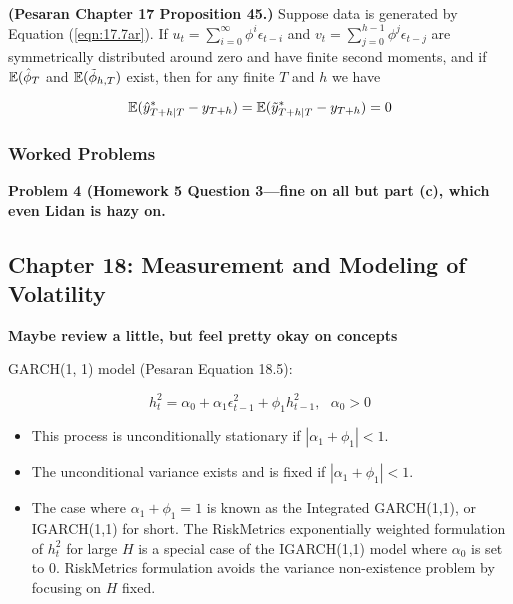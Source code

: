 \begin{proposition}\textbf{(Pesaran Chapter 17 Proposition 45.)} Suppose data is generated by Equation (\ref{eqn:17.7ar}). If \(u_t = \sum_{i=0}^\infty \phi^i \epsilon_{t-i}\) and \(v_t = \sum_{j=0}^{h-1} \phi^j \epsilon_{t-j}\) are symmetrically distributed around zero and have finite second moments, and if \(\mathbb{E}(\hat{\phi}_T\) and \(\mathbb{E}(\tilde{\phi}_{h,T} )\) exist, then for any finite \(T\) and \(h\) we have

\[
\mathbb{E}(\hat{y}_{T+h \mid T}^* - y_{T +h}) = \mathbb{E} (\tilde{y}_{T+h \mid T}^* - y_{T+h}) = 0
\]
\end{proposition}

\subsubsection{Worked Problems}

\textbf{Problem 4 (Homework 5 Question 3---fine on all but part (c), which even Lidan is hazy on.}

%
%
%
%
%
%

\subsection{Chapter 18: Measurement and Modeling of Volatility}

\textbf{Maybe review a little, but feel pretty okay on concepts}

GARCH(1, 1) model (Pesaran Equation 18.5):

\begin{equation} \label{ts.eq.18.5}
h_t^2 = \alpha_0 + \alpha_1 \epsilon_{t-1}^2 + \phi_1 h_{t-1}^2, \ \ \ \alpha_0 > 0
\end{equation}

\begin{itemize}
\item This process is unconditionally stationary if \(|\alpha_1 + \phi_1| < 1\). 

\item The unconditional variance exists and is fixed if \(|\alpha_1 + \phi_1| < 1\). 

\item The case where \(\alpha_1 + \phi_1 = 1\) is known as the Integrated GARCH(1,1), or IGARCH(1,1) for short. The RiskMetrics exponentially weighted formulation of \(h_t^2\) for large \(H\) is a special case of the IGARCH(1,1) model where \(\alpha_0\) is set to 0. RiskMetrics formulation avoids the variance non-existence problem by focusing on \(H\) fixed.
\end{itemize}

